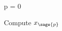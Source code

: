 \documentclass{ximera}
\author{Jim Fowler}
\begin{document}
\begin{sagesilent}
  p = 0
\end{sagesilent}

\begin{exercise}

  Compute $x_{\sage{p}}$


  
\end{exercise}
\end{document}
